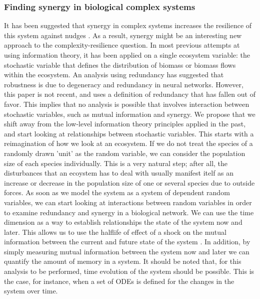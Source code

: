 \documentclass[../main.tex]{subfiles}
\begin{document}
\subsubsection{Finding synergy in biological complex systems}

It has been suggested that synergy in complex systems increases the resilience of this system against nudges \cite{quax2017quantifying}.
As a result, synergy might be an interesting new approach to the complexity-resilience question.
In most previous attempts at using information theory, it has been applied on a single ecosystem variable: the stochastic variable that defines the distribution of biomass or biomass flows within the ecosystem.
An analysis using redundancy has suggested that robustness is due to degeneracy and redundancy in neural networks.
However, this paper is not recent, and uses a definition of redundancy that has fallen out of favor.
This implies that no analysis is possible that involves interaction between stochastic variables, such as mutual information and synergy.
We propose that we shift away from the low-level information theory principles applied in the past, and start looking at relationships between stochastic variables.
This starts with a reimagination of how we look at an ecosystem.
If we do not treat the species of a randomly drawn 'unit' as the random variable, we can consider the population size of each species individually.
This is a very natural step; after all, the disturbances that an ecoystem has to deal with usually manifest itelf as an increase or decrease in the population size of one or several species due to outside forces.
As soon as we model the system as a system of dependent random variables, we can start looking at interactions between random variables in order to examine redundancy and synergy in a biological network.
We can use the time dimension as a way to establish relationships the state of the system now and later.
This allows us to use the halflife of effect of a shock on the mutual information between the current and future state of the system \cite{QuaxPersonal}.
In addition, by simply measuring mutual information between the system now and later we can quantify the amount of memory in a system.
It should be noted that, for this analysis to be performed, time evolution of the system should be possible.
This is the case, for instance, when a set of ODEs is defined for the changes in the system over time.
\end{document}

